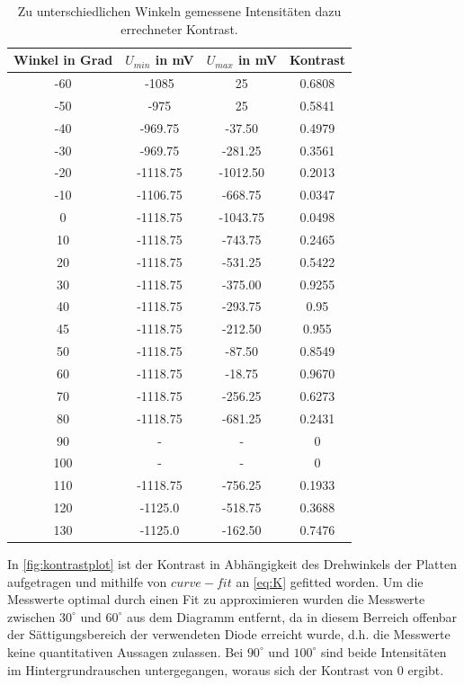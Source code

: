 \begin{table}[H]
  \center
  \caption{Zu unterschiedlichen Winkeln gemessene Intensitäten dazu errechneter Kontrast.}
  \label{tab:Kontrast}
\begin{tabular}{c|c|c|c}
  Winkel in Grad& $U_{min}$ in mV& $U_{max}$ in mV& Kontrast\\
  \hline
  -60 &    -1085&       25& 0.6808\\
  -50 &     -975&       25& 0.5841\\
  -40 &  -969.75&   -37.50& 0.4979\\
  -30 &  -969.75&  -281.25& 0.3561\\
  -20 & -1118.75& -1012.50& 0.2013\\
  -10 & -1106.75&  -668.75& 0.0347\\
  0   & -1118.75& -1043.75& 0.0498\\
  10  & -1118.75&  -743.75& 0.2465\\
  20  & -1118.75&  -531.25& 0.5422\\
  30  & -1118.75&  -375.00& 0.9255\\
  40  & -1118.75&  -293.75& 0.95\\
  45  & -1118.75&  -212.50& 0.955\\
  50  & -1118.75&   -87.50& 0.8549\\
  \hline
  60  & -1118.75&   -18.75& 0.9670\\
  \hline
  70  & -1118.75&  -256.25& 0.6273\\
  80  & -1118.75&  -681.25& 0.2431\\
  90  &        -&        -&      0\\
  100 &        -&        -&      0\\
  110 & -1118.75&  -756.25& 0.1933\\
  120 &  -1125.0&  -518.75& 0.3688\\
  130 &  -1125.0&  -162.50& 0.7476\\
\end{tabular}
\end{table}
In \ref{fig:kontrastplot} ist der Kontrast in Abhängigkeit des Drehwinkels der Platten aufgetragen und mithilfe von $curve-fit$ \cite{scipy} an \eqref{eq:K} gefitted worden.
Um die Messwerte optimal durch einen Fit zu approximieren wurden die Messwerte zwischen $30^\circ$ und $60^\circ$ aus dem Diagramm entfernt, da in diesem Berreich offenbar der Sättigungsbereich der verwendeten Diode erreicht wurde, d.h. die Messwerte keine quantitativen Aussagen zulassen. Bei $90^\circ$ und $100^\circ$ sind beide Intensitäten im Hintergrundrauschen untergegangen, woraus sich der Kontrast von 0 ergibt.\\
